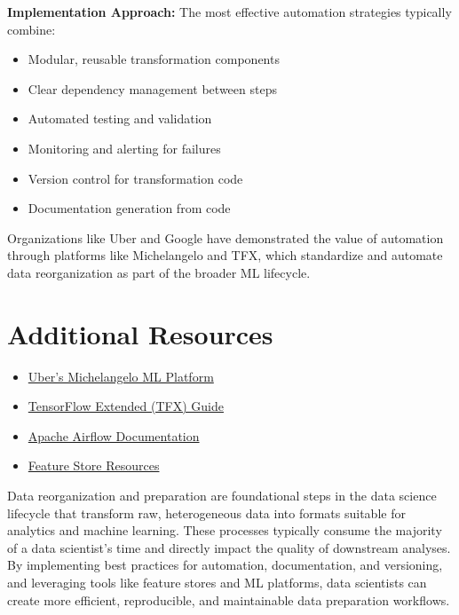\documentclass[12pt]{article}
\begin{document}
\begin{enumerate}
\begin{tcolorbox}[colback=blue!5!white,colframe=blue!75!black,title={Solution}]
    \textbf{Implementation Approach:}
    The most effective automation strategies typically combine:
    \begin{itemize}
        \item Modular, reusable transformation components
        \item Clear dependency management between steps
        \item Automated testing and validation
        \item Monitoring and alerting for failures
        \item Version control for transformation code
        \item Documentation generation from code
    \end{itemize}
    
    Organizations like Uber and Google have demonstrated the value of automation through platforms like Michelangelo and TFX, which standardize and automate data reorganization as part of the broader ML lifecycle.
    \end{tcolorbox}
\end{enumerate}

\section{Additional Resources}

\begin{itemize}
    \item \href{https://eng.uber.com/michelangelo/}{Uber's Michelangelo ML Platform}
    \item \href{https://www.tensorflow.org/tfx/guide}{TensorFlow Extended (TFX) Guide}
    \item \href{https://airflow.apache.org/}{Apache Airflow Documentation}
    \item \href{https://www.featurestore.org/}{Feature Store Resources}
\end{itemize}

\begin{tcolorbox}[colback=red!5!white,colframe=red!75!black,title={Key Takeaway}]
Data reorganization and preparation are foundational steps in the data science lifecycle that transform raw, heterogeneous data into formats suitable for analytics and machine learning. These processes typically consume the majority of a data scientist's time and directly impact the quality of downstream analyses. By implementing best practices for automation, documentation, and versioning, and leveraging tools like feature stores and ML platforms, data scientists can create more efficient, reproducible, and maintainable data preparation workflows.
\end{tcolorbox}
\end{document}
